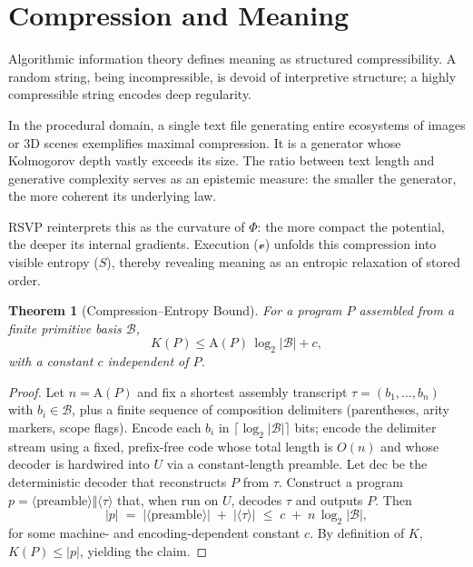 \documentclass[12pt,a4paper]{article}
\theoremstyle{plain}
\newtheorem{theorem}{Theorem}[section]
\theoremstyle{definition}
\theoremstyle{remark}
\newcommand{\Phifield}{\Phi}
\newcommand{\vfield}{\mathcal{v}}
\newcommand{\Sfield}{S}
\newcommand{\AI}{\mathrm{A}}
\begin{document}
\section{Compression and Meaning}
\label{sec:compression-meaning}

Algorithmic information theory defines meaning as structured compressibility. A random string, being incompressible, is devoid of interpretive structure; a highly compressible string encodes deep regularity.

In the procedural domain, a single text file generating entire ecosystems of images or 3D scenes exemplifies maximal compression. It is a generator whose Kolmogorov depth vastly exceeds its size. The ratio between text length and generative complexity serves as an epistemic measure: the smaller the generator, the more coherent its underlying law.

RSVP reinterprets this as the curvature of $\Phifield$: the more compact the potential, the deeper its internal gradients. Execution ($\vfield$) unfolds this compression into visible entropy ($\Sfield$), thereby revealing meaning as an entropic relaxation of stored order.

\begin{theorem}[Compression–Entropy Bound]
For a program $P$ assembled from a finite primitive basis $\mathcal{B}$,
\[
K(P) \le \AI(P)\,\log_2|\mathcal{B}| + c,
\]
with a constant $c$ independent of $P$.
\end{theorem}

\begin{proof}
Let $n=\AI(P)$ and fix a shortest assembly transcript $\tau=(b_1,\dots,b_n)$ with $b_i\in\mathcal{B}$, plus a finite sequence of composition delimiters (parentheses, arity markers, scope flags). Encode each $b_i$ in $\lceil \log_2|\mathcal{B}|\rceil$ bits; encode the delimiter stream using a fixed, prefix-free code whose total length is $O(n)$ and whose decoder is hardwired into $U$ via a constant-length preamble. Let $\mathrm{dec}$ be the deterministic decoder that reconstructs $P$ from $\tau$. Construct a program $p=\langle \mathrm{preamble}\rangle\Vert\langle \tau\rangle$ that, when run on $U$, decodes $\tau$ and outputs $P$. Then
\[
|p| \;=\; |\langle \mathrm{preamble}\rangle| \;+\; |\langle \tau\rangle| \;\le\; c \;+\; n\,\log_2|\mathcal{B}|,
\]
for some machine- and encoding-dependent constant $c$. By definition of $K$, $K(P)\le |p|$, yielding the claim.
\end{proof}
\end{document}

